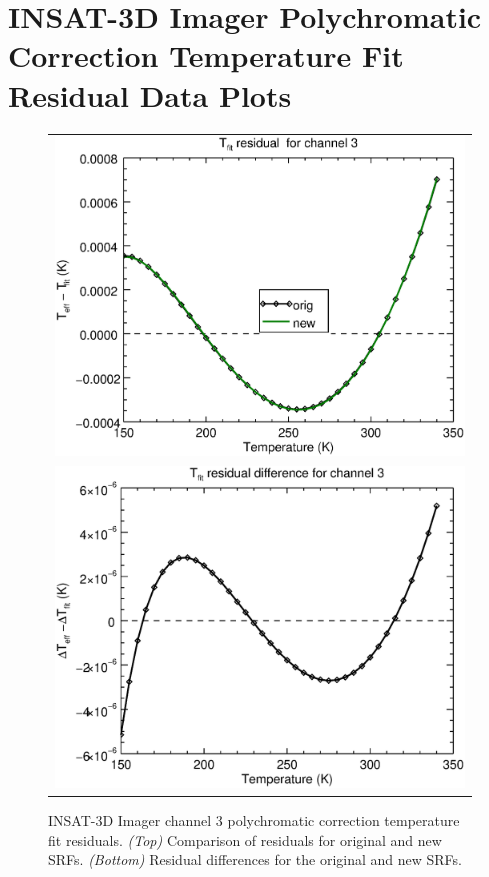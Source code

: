 \section{INSAT-3D Imager Polychromatic Correction Temperature Fit Residual Data Plots}
\label{app.imgr_tfit_data_plots}

\begin{figure}[H]
  \centering
  \begin{tabular}{c}
    \includegraphics[scale=0.55]{graphics/imgr/tfit/imgr_insat3d-3.tfit.eps} \\
    \includegraphics[scale=0.55]{graphics/imgr/tfit/imgr_insat3d-3.tfit.difference.eps}
  \end{tabular}
  \caption{INSAT-3D Imager channel 3 polychromatic correction temperature fit residuals. \emph{(Top)} Comparison of residuals for original and new SRFs. \emph{(Bottom)} Residual differences for the original and new SRFs.}
  \label{fig:imgr_ch3_tfit}
\end{figure}



